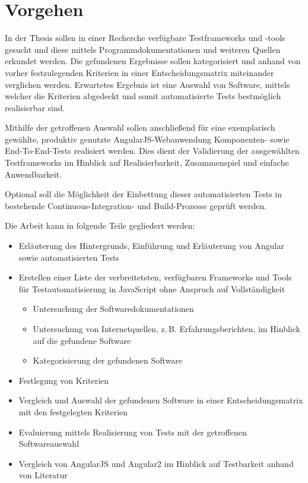 \section{Vorgehen}
In der Thesis sollen in einer Recherche verfügbare Testframeworks und -tools gesucht und diese mittels Programmdokumentationen und weiteren Quellen erkundet werden. Die gefundenen Ergebnisse sollen kategorisiert und anhand von vorher festzulegenden Kriterien in einer Entscheidungsmatrix miteinander verglichen werden. Erwartetes Ergebnis ist eine Auswahl von Software, mittels welcher die Kriterien abgedeckt und somit automatisierte Tests bestmöglich realisierbar sind. 

Mithilfe der getroffenen Auswahl sollen anschließend für eine exemplarisch gewählte, produktiv genutzte AngularJS-Webanwendung Komponenten- sowie End-To-End-Tests realisiert werden. Dies dient der Validierung der ausgewählten Testframeworks im Hinblick auf Realisierbarkeit, Zusammenspiel und einfache Anwendbarkeit.

Optional soll die Möglichkeit der Einbettung dieser automatisierten Tests in bestehende Continuous-Integration- und Build-Prozesse geprüft werden.

Die Arbeit kann in folgende Teile gegliedert werden:
\begin{itemize}
	\item Erläuterung des Hintergrunds, Einführung und Erläuterung von Angular sowie automatisierten Tests
	\item Erstellen einer Liste der verbreitetsten, verfügbaren Frameworks und Tools für Testautomatisierung in JavaScript ohne Anspruch auf Vollständigkeit
	\begin{itemize}
		\item Untersuchung der Softwaredokumentationen
		\item Untersuchung von Internetquellen, z.\,B. Erfahrungsberichten, im Hinblick auf die gefundene Software
		\item Kategorisierung der gefundenen Software
	\end{itemize}
	\item Festlegung von Kriterien
	\item Vergleich und Auswahl der gefundenen Software in einer Entscheidungsmatrix mit den festgelegten Kriterien
	\item Evaluierung mittels Realisierung von Tests mit der getroffenen Softwareauswahl
	\item Vergleich von AngularJS und Angular2 im Hinblick auf Testbarkeit anhand von Literatur
\end{itemize}